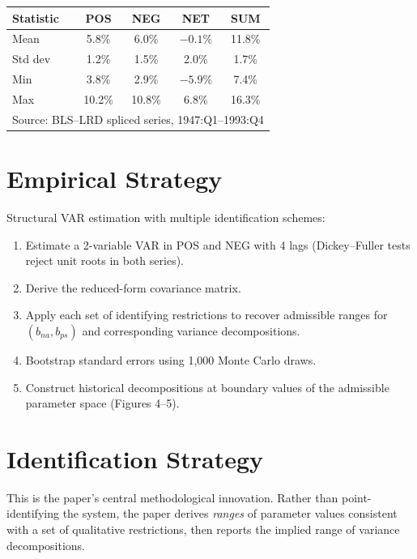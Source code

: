 \begin{center}
\begin{tabular}{lcccc}
\toprule
\textbf{Statistic} & \textbf{POS} & \textbf{NEG} & \textbf{NET} & \textbf{SUM} \\
\midrule
Mean & 5.8\% & 6.0\% & $-0.1\%$ & 11.8\% \\
Std dev & 1.2\% & 1.5\% & 2.0\% & 1.7\% \\
Min & 3.8\% & 2.9\% & $-5.9\%$ & 7.4\% \\
Max & 10.2\% & 10.8\% & 6.8\% & 16.3\% \\
\bottomrule
\multicolumn{5}{l}{\small Source: BLS--LRD spliced series, 1947:Q1--1993:Q4}
\end{tabular}
\end{center}

\section{Empirical Strategy}

Structural VAR estimation with multiple identification schemes:
\begin{enumerate}
  \item Estimate a 2-variable VAR in POS and NEG with 4 lags (Dickey--Fuller
    tests reject unit roots in both series).
  \item Derive the reduced-form covariance matrix.
  \item Apply each set of identifying restrictions to recover admissible ranges
    for $(b_{na}, b_{ps})$ and corresponding variance decompositions.
  \item Bootstrap standard errors using 1,000 Monte Carlo draws.
  \item Construct historical decompositions at boundary values of the
    admissible parameter space (Figures 4--5).
\end{enumerate}

\section{Identification Strategy}

This is the paper's central methodological innovation. Rather than point-
identifying the system, the paper derives \emph{ranges} of parameter values
consistent with a set of qualitative restrictions, then reports the implied
range of variance decompositions.

